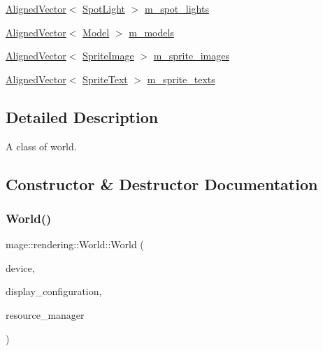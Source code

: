 \begin{DoxyCompactItemize}
\item 
\mbox{\hyperlink{namespacemage_a8664bfb5ce2179fc64eae9f82c8a5ba8}{Aligned\+Vector}}$<$ \mbox{\hyperlink{classmage_1_1rendering_1_1_spot_light}{Spot\+Light}} $>$ \mbox{\hyperlink{classmage_1_1rendering_1_1_world_a6ea472361d7d1a6a829a9270913059c2}{m\+\_\+spot\+\_\+lights}}
\item 
\mbox{\hyperlink{namespacemage_a8664bfb5ce2179fc64eae9f82c8a5ba8}{Aligned\+Vector}}$<$ \mbox{\hyperlink{classmage_1_1rendering_1_1_model}{Model}} $>$ \mbox{\hyperlink{classmage_1_1rendering_1_1_world_aed32b3cd3f6d46c68493a48d42047c1f}{m\+\_\+models}}
\item 
\mbox{\hyperlink{namespacemage_a8664bfb5ce2179fc64eae9f82c8a5ba8}{Aligned\+Vector}}$<$ \mbox{\hyperlink{classmage_1_1rendering_1_1_sprite_image}{Sprite\+Image}} $>$ \mbox{\hyperlink{classmage_1_1rendering_1_1_world_ae407a779908a300c6c979fd0e11c1471}{m\+\_\+sprite\+\_\+images}}
\item 
\mbox{\hyperlink{namespacemage_a8664bfb5ce2179fc64eae9f82c8a5ba8}{Aligned\+Vector}}$<$ \mbox{\hyperlink{classmage_1_1rendering_1_1_sprite_text}{Sprite\+Text}} $>$ \mbox{\hyperlink{classmage_1_1rendering_1_1_world_a6d3d85a9a5d13e6ba74d56ace106a865}{m\+\_\+sprite\+\_\+texts}}
\end{DoxyCompactItemize}


\subsection{Detailed Description}
A class of world. 

\subsection{Constructor \& Destructor Documentation}
\mbox{\label{classmage_1_1rendering_1_1_world_af9fc38564ff93abc8c760ab15f1faffe}} 
\subsubsection{\texorpdfstring{World()}{World()}\hspace{0.1cm}{\footnotesize\ttfamily [1/3]}}
{\footnotesize\ttfamily mage\+::rendering\+::\+World\+::\+World (\begin{DoxyParamCaption}\item[{I\+D3\+D11\+Device \&}]{device,  }\item[{\mbox{\hyperlink{classmage_1_1rendering_1_1_display_configuration}{Display\+Configuration}} \&}]{display\+\_\+configuration,  }\item[{\mbox{\hyperlink{classmage_1_1rendering_1_1_resource_manager}{Resource\+Manager}} \&}]{resource\+\_\+manager }\end{DoxyParamCaption})\hspace{0.3cm}{\ttfamily [explicit]}}

